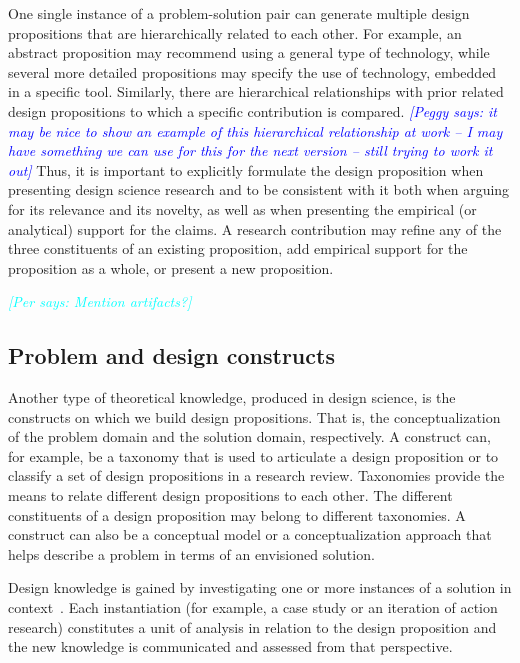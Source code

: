 \documentclass[graybox]{svmult}
\newcommand{\peggy}[1]{\textcolor{blue}{{\it [Peggy says: #1]}}}
\newcommand{\per}[1]{\textcolor{cyan}{{\it [Per says: #1]}}}
\newcommand{\peggy}[1]{}
\newcommand{\per}[1]{}
\begin{document}
One single instance of a problem-solution pair can generate multiple design propositions that are hierarchically related to each other. For example, an abstract proposition may recommend using a general type of technology, while several more detailed propositions may specify the use of technology, embedded in a specific tool.  Similarly, there are hierarchical relationships with prior related design propositions to which a specific contribution is compared.
\peggy{it may be nice to show an example of this hierarchical relationship at work -- I may have something we can use for this for the next version -- still trying to work it out}
Thus, it is important to explicitly formulate the design proposition when presenting design science research and to be consistent with it both when arguing for its relevance and its novelty, as well as when presenting the empirical (or analytical) support for the claims.  A research contribution may refine any of the three constituents of an existing proposition, add empirical support for the proposition as a whole, or present a new proposition.

\per{Mention artifacts?}



\subsection{Problem and design constructs}
\label{sec:constructs}
Another type of theoretical knowledge, produced in design science, is the 
constructs on which we build design propositions. That is, the conceptualization of the problem domain and the solution domain, respectively.  
A construct can, for example, be a taxonomy that is used to articulate a design proposition or to classify a set of design propositions in a research review. 
Taxonomies provide the means to relate different design propositions to each other. The different constituents of a design proposition may belong to different taxonomies. A construct can also be a conceptual model or a conceptualization approach that helps describe a problem in terms of an envisioned solution.

Design knowledge is gained by investigating one or more instances of a solution in context~\cite{wieringa_what_2014}. Each instantiation (for example, a case study or an iteration of action research) constitutes a unit of analysis in relation to the design proposition and the new knowledge is communicated and assessed from that perspective. 
\end{document}

